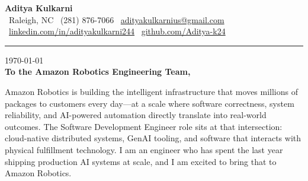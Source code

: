 \documentclass[11pt,letterpaper]{article}
\begin{document}
\begin{center}
    {\Huge \textbf{\color{AmazonOrange} Aditya Kulkarni}}\\[8pt]
    {\color{DarkGrey} \small
    \faMapMarker* \ Raleigh, NC \quad \textbar \quad
    \faPhone \ (281) 876-7066 \quad \textbar \quad
    \faEnvelope \ \href{mailto:adityakulkarnius@gmail.com}{adityakulkarnius@gmail.com} \\[4pt]
    \faLinkedin \ \href{https://linkedin.com/in/adityakulkarni244}{linkedin.com/in/adityakulkarni244} \quad \textbar \quad
    \faGithub \ \href{https://github.com/Aditya-k24}{github.com/Aditya-k24}
    }
\end{center}

\vspace{-4pt}
{\color{AmazonOrange}\rule{\linewidth}{1.5pt}}
\vspace{10pt}

\today\\[10pt]
\textbf{To the Amazon Robotics Engineering Team,}

\vspace{6pt}

Amazon Robotics is building the intelligent infrastructure that moves millions of packages to customers every day---at a scale where software correctness, system reliability, and AI-powered automation directly translate into real-world outcomes. The Software Development Engineer role sits at that intersection: cloud-native distributed systems, GenAI tooling, and software that interacts with physical fulfillment technology. I am an engineer who has spent the last year shipping production AI systems at scale, and I am excited to bring that to Amazon Robotics.

\vspace{4pt}
\end{document}
